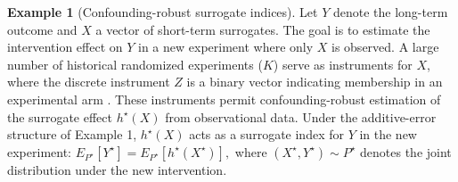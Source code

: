 \documentclass[11pt]{article}
\theoremstyle{plain}
\theoremstyle{definition}
\newtheorem{example}{Example}
\theoremstyle{remark}
\theoremstyle{definition}
\begin{document}
\setcounter{example}{1}
\begin{example}[Confounding-robust surrogate indices]
Let \(Y\) denote the long-term outcome and \(X\) a vector of short-term surrogates. The goal is to estimate the intervention effect on \(Y\) in a new experiment where only \(X\) is observed. A large number of historical randomized experiments (\(K\)) serve as instruments for \(X\), where the discrete instrument \(Z\) is a binary vector indicating membership in an experimental arm \citep{peysakhovich2018learning}. These instruments permit confounding-robust estimation of the surrogate effect \(h^\star(X)\) from observational data. Under the additive-error structure of Example 1, \(h^\star(X)\) acts as a surrogate index for \(Y\) in the new experiment: $E_{P^\star}[Y^\star] = E_{P^\star}[h^\star(X^\star)],$
where \((X^\star, Y^\star) \sim P^\star\) denotes the joint distribution under the new intervention.
\end{example}

   



 








 
\end{document}

